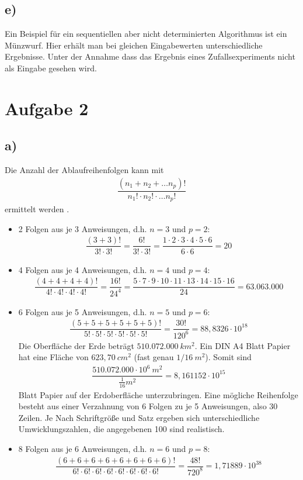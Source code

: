 \documentclass[11pt,a4paper,DIV=10,]{scrartcl}
\begin{document}
\subsection*{e)}
Ein Beispiel für ein sequentiellen aber nicht determinierten Algorithmus ist ein Münzwurf. Hier erhält man bei gleichen Eingabewerten unterschiedliche Ergebnisse. Unter der Annahme dass das Ergebnis eines Zufallsexperiments nicht als Eingabe gesehen wird. 


\section*{Aufgabe 2}
\subsection*{a)}
Die Anzahl der Ablaufreihenfolgen kann mit 
\begin{align*}
\dfrac{(n_1+n_2+\dots n_p)!}{n_1!\cdot n_2!\cdot \dots n_p!}
\end{align*}
ermittelt werden \cite[vgl.][S. 3f]{Maurer.2012}.
\begin{itemize}
\item 2 Folgen aus je 3 Anweisungen, d.h. $n=3$ und $p=2$:
\begin{align*}
\dfrac{(3+3)!}{3!\cdot 3!}=\dfrac{6!}{3!\cdot 3!}=\dfrac{1\cdot 2\cdot 3\cdot 4\cdot 5\cdot 6}{6\cdot 6} = 20
\end{align*}
\item 4 Folgen aus je 4 Anweisungen, d.h. $n=4$ und $p=4$:
\begin{align*}
\dfrac{(4+4+4+4)!}{4!\cdot 4!\cdot 4!\cdot 4!}=\dfrac{16!}{24^4}=\dfrac{5\cdot 7\cdot 9\cdot 10\cdot 11\cdot 13\cdot 14\cdot 15\cdot 16}{24} = 63.063.000
\end{align*}
\item 6 Folgen aus je 5 Anweisungen, d.h. $n=5$ und $p=6$:
\begin{align*}
\dfrac{(5+5+5+5+5+5)!}{5!\cdot 5!\cdot 5!\cdot 5!\cdot 5!\cdot 5!}=\dfrac{30!}{120^6}= 88,8326\cdot10^{18}
\end{align*}
Die Oberfläche der Erde beträgt $510.072.000\ km^2$. Ein DIN A4 Blatt Papier hat eine Fläche von $623,70\ cm^2$ (fast genau $1/16\ m^2$). Somit sind 
\begin{align*}
\dfrac{510.072.000\cdot 10^6\ m^2}{\frac{1}{16} m^2}=8,161152\cdot 10^{15}
\end{align*}
Blatt Papier auf der Erdoberfläche unterzubringen. Eine mögliche Reihenfolge besteht aus einer Verzahnung von 6 Folgen zu je 5 Anweisungen, also 30 Zeilen. Je Nach Schriftgröße und  Satz ergeben sich unterschiedliche \glqq Umwicklungszahlen\grqq , die angegebenen 100 sind realistisch.

\item 8 Folgen aus je 6 Anweisungen, d.h. $n=6$ und $p=8$:
\begin{align*}
\dfrac{(6+6+6+6+6+6+6+6)!}{6!\cdot 6!\cdot 6!\cdot 6!\cdot 6!\cdot 6!\cdot 6!\cdot 6!}=\dfrac{48!}{720^8}= 1,71889\cdot 10^{38}
\end{align*}
\end{itemize}
\end{document}
